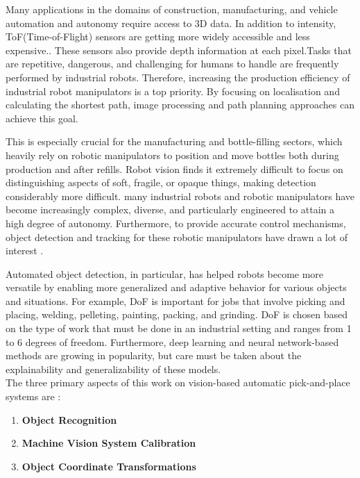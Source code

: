 \documentclass[12pt]{article}
\begin{document}
Many applications in the domains of construction, manufacturing, and vehicle automation and autonomy require access to 3D data. In addition to intensity, ToF(Time-of-Flight) sensors are getting more widely accessible and less expensive.. These sensors also provide depth information at each pixel.Tasks that are repetitive, dangerous, and challenging for humans to handle are frequently performed by industrial robots. Therefore, increasing the production efficiency of industrial robot manipulators is a top priority. By focusing on localisation and calculating the shortest path, image processing and path planning approaches can achieve this goal.  

This is especially crucial for the manufacturing and bottle-filling sectors, which heavily rely on robotic manipulators to position and move bottles both during production and after refills. Robot vision finds it extremely difficult to focus on distinguishing aspects of soft, fragile, or opaque things, making detection considerably more difficult. many industrial robots and robotic manipulators have become increasingly complex, diverse, and particularly engineered to attain a high degree of autonomy. Furthermore, to provide accurate control mechanisms, object detection and tracking for these robotic manipulators have drawn a lot of interest \cite {ref12}.

Automated object detection, in particular, has helped robots become more versatile by enabling more generalized and adaptive behavior for various objects and situations. For example, DoF is important for jobs that involve picking and placing, welding, pelleting, painting, packing, and grinding. DoF is chosen based on the type of work that must be done in an industrial setting and ranges from 1 to 6 degrees of freedom. Furthermore, deep learning and neural network-based methods are growing in popularity, but care must be taken about the explainability and generalizability of these models\cite{ref12}.\\


The three primary aspects of this work on vision-based automatic pick-and-place systems are \cite{ref12}:
\begin{enumerate}
  \item \textbf{Object Recognition}
  \item \textbf{Machine Vision System Calibration}
  \item \textbf{Object Coordinate Transformations}
\end{enumerate}
\end{document}
